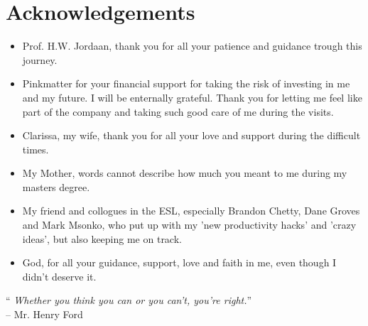 \chapter*{Acknowledgements}
\makeatletter{}\makeatother

\begin{itemize}
	\item Prof. H.W. Jordaan, thank you for all your patience and guidance trough this journey.
	\item Pinkmatter for your financial support for taking the risk of investing in me and my future. 
	I will be enternally grateful. Thank you for letting me feel like part of the company and taking such good care of me during the visits.
	\item Clarissa, my wife, thank you for all your love and support during the difficult times.
	\item My Mother, words cannot describe how much you meant to me during my masters degree.
	\item My friend and collogues in the ESL, especially Brandon Chetty, Dane Groves and Mark Msonko, who put up with my 'new productivity hacks' and 'crazy ideas', but also keeping me on track.
	\item God, for all your guidance, support, love and faith in me, even though I didn't deserve it.
\end{itemize}
\begin{centering}

	
{\LARGE``} \textit{Whether you think you can or you can't, you're right.}{\LARGE''}\\
-- Mr. Henry Ford\\


\end{centering}
